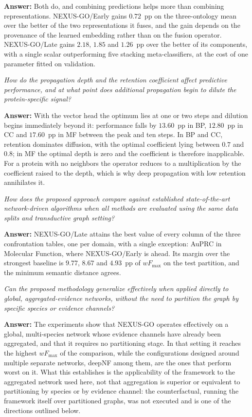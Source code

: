 \documentclass[Ingles]{ic-tese-v3}
\begin{document}
\begin{description}
\textbf{Answer:} Both do, and combining predictions helps more than combining
representations. NEXUS-GO/Early gains $0.72$~pp on the three-ontology mean over the better of
the two representations it fuses, and the gain depends on the provenance of the learned
embedding rather than on the fusion operator. NEXUS-GO/Late gains $2.18$, $1.85$ and
$1.26$~pp over the better of its components, with a single scalar outperforming five stacking
meta-classifiers, at the cost of one parameter fitted on validation.

\item[RQ5] \emph{How do the propagation depth and the retention coefficient affect predictive
performance, and at what point does additional propagation begin to dilute the
protein-specific signal?}

\textbf{Answer:} With the vector head the optimum lies at one or two steps and dilution
begins immediately beyond it: performance falls by $13.60$~pp in BP, $12.80$~pp in CC and
$17.60$~pp in MF between the peak and ten steps. In BP and CC, retention dominates diffusion, with the
optimal coefficient lying between $0.7$ and $0.8$; in MF the optimal depth is zero and the
coefficient is therefore inapplicable. For a protein with no neighbors the operator
reduces to a multiplication by the coefficient raised to the depth, which is why deep
propagation with low retention annihilates it.

\item[RQ6] \emph{How does the proposed approach compare against established state-of-the-art
network-driven algorithms when all methods are evaluated using the same data splits and
transductive graph setting?}

\textbf{Answer:} NEXUS-GO/Late attains the best value of every column of the three
confrontation tables, one per domain, with a single exception: AuPRC in Molecular Function,
where NEXUS-GO/Early is ahead. Its
margin over the strongest baseline is $9.77$, $8.67$ and $4.93$~pp of $wF_{\max}$ on the test
partition, and the minimum semantic distance agrees.

\item[RQ7] \emph{Can the proposed methodology generalize effectively when applied directly to
global, aggregated-evidence networks, without the need to partition the graph by specific
species or evidence channels?}

\textbf{Answer:} The experiments show that NEXUS-GO operates effectively on a global,
multi-species network whose evidence channels have already been aggregated, and that it
requires no partitioning stage. In that setting it reaches the highest $wF_{\max}$ of the
comparison, while the configurations designed around multiple separate networks, deepNF among
them, are the ones that perform worst on it. What this establishes is the applicability of the
framework to the aggregated network used here, not that aggregation is superior or equivalent
to partitioning by species or by evidence channel: the counterfactual, running the framework
itself over partitioned graphs, was not executed and is one of the directions outlined below. %


\end{description}
\end{document}
